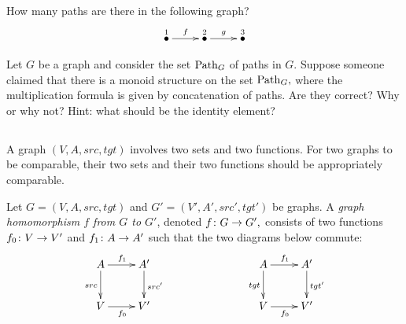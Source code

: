 \documentclass[../main/CT4S-EN-RU]{subfiles}
\begin{document}
\begin{exerciseENG}
How many paths are there in the following graph? 
$$\xymatrix{\LMO{1}\ar[r]^{f}&\LMO{2}\ar[r]^{g}&\LMO{3}}$$
\end{exerciseENG}

\begin{exerciseRUS}
\end{exerciseRUS}

\begin{exerciseENG}
Let $G$ be a graph and consider the set $\operatorname{Path}_G$ of paths in $G.$ Suppose someone claimed that there is a monoid structure on the set $\operatorname{Path}_G,$ where the multiplication formula is given by concatenation of paths. Are they correct? Why or why not? Hint: what should be the identity element?
\end{exerciseENG}

\begin{exerciseRUS}
\end{exerciseRUS}


\subsection{}

\begin{blockENG}
A graph $(V,A,src,tgt)$ involves two sets and two functions. For two graphs to be comparable, their two sets and their two functions should be appropriately comparable.
\end{blockENG}

\begin{blockRUS}
\end{blockRUS}

\begin{definitionENG}\label{def:graph homomorphism}
Let $G=(V,A,src,tgt)$ and $G'=(V',A',src',tgt')$ be graphs. A {\em graph homomorphism $f$ from $G$ to $G'$}, denoted $f\colon G\rightarrow G',$ consists of two functions $f_0\colon V\rightarrow V'$ and $f_1\colon A\rightarrow A'$ such that the two diagrams below commute:
\begin{align}\label{dia:graph hom}
\xymatrix{A\ar[r]^{f_1}\ar[d]_{src}&A'\ar[d]^{src'}\\V\ar[r]_{f_0}&V'
}\hspace{1in}
\xymatrix{A\ar[r]^{f_1}\ar[d]_{tgt}&A'\ar[d]^{tgt'}\\V\ar[r]_{f_0}&V'
}
\end{align}
\end{definitionENG}
\end{document}
